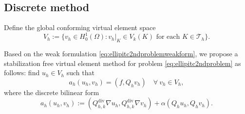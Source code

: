 \documentclass[10pt]{amsart}
\renewcommand{\div}{\operatorname{div}}
\numberwithin{equation}{section}
\begin{document}


\subsection{Discrete method}
Define the global conforming virtual element space
\[
V_h:=\{v_h\in H_0^1(\Omega): v_h|_K\in V_k(K) \textrm{ for each } K\in\mathcal T_h\}.
\]

Based on the weak formulation \eqref{eq:ellipitc2ndproblemweakform}, we propose a stabilization free virtual element method for problem \eqref{eq:ellipitc2ndproblem} as follows: find $u_h\in V_h$ such that
\begin{equation}\label{eq:cfmvem}
a_h(u_h, v_h)=(f, Q_hv_h)\quad\forall~v_h\in V_h,
\end{equation} 
where the discrete bilinear form 
\[
a_h(u_h, v_h):=(Q_{h,k}^{\div}\nabla u_h, Q_{h,k}^{\div}\nabla v_h)+\alpha(Q_hu_h, Q_hv_h).
\]
\end{document}
